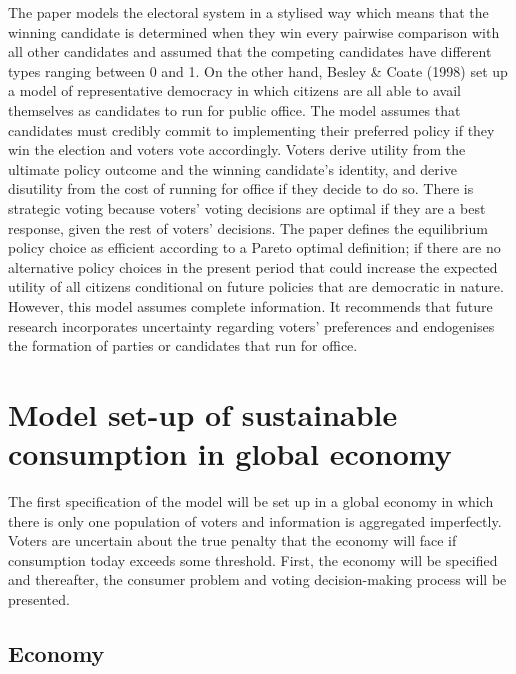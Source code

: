 \documentclass[11pt,preprint, authoryear]{elsarticle}
\numberwithin{equation}{section}
\numberwithin{figure}{section}
\numberwithin{table}{section}
\begin{document}
The paper models the electoral system in a stylised way which means that
the winning candidate is determined when they win every pairwise
comparison with all other candidates and assumed that the competing
candidates have different types ranging between 0 and 1. On the other
hand, Besley \& Coate (1998) set up a model of representative democracy
in which citizens are all able to avail themselves as candidates to run
for public office. The model assumes that candidates must credibly
commit to implementing their preferred policy if they win the election
and voters vote accordingly. Voters derive utility from the ultimate
policy outcome and the winning candidate's identity, and derive
disutility from the cost of running for office if they decide to do so.
There is strategic voting because voters' voting decisions are optimal
if they are a best response, given the rest of voters' decisions. The
paper defines the equilibrium policy choice as efficient according to a
Pareto optimal definition; if there are no alternative policy choices in
the present period that could increase the expected utility of all
citizens conditional on future policies that are democratic in nature.
However, this model assumes complete information. It recommends that
future research incorporates uncertainty regarding voters' preferences
and endogenises the formation of parties or candidates that run for
office.

\hypertarget{model-set-up-of-sustainable-consumption-in-global-economy}{%
\section{Model set-up of sustainable consumption in global
economy}\label{model-set-up-of-sustainable-consumption-in-global-economy}}

The first specification of the model will be set up in a global economy
in which there is only one population of voters and information is
aggregated imperfectly. Voters are uncertain about the true penalty that
the economy will face if consumption today exceeds some threshold.
First, the economy will be specified and thereafter, the consumer
problem and voting decision-making process will be presented.

\hypertarget{economy}{%
\subsection*{Economy}\label{economy}}
\end{document}
